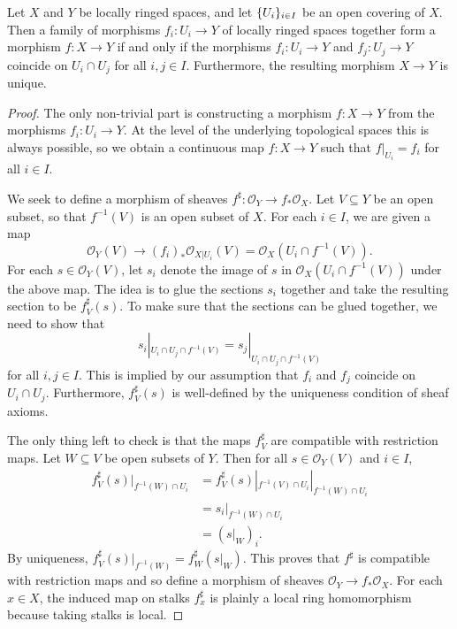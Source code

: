 \documentclass[12pt]{book}
\theoremstyle{definition}
\DeclarePairedDelimiter{\Set}{\lbrace}{\rbrace}
\begin{document}
	\begin{lemma}
		Let $X$ and $Y$ be locally ringed spaces, and let $\Set{U_i}_{i \in I}$ be an open covering of $X$. Then a family of morphisms $f_i \colon U_i \to Y$ of locally ringed spaces together form a morphism $f \colon X \to Y$ if and only if the morphisms $f_i \colon U_i \to Y$ and $f_j \colon U_j \to Y$ coincide on $U_i \cap U_j$ for all $i, j \in I$. Furthermore, the resulting morphism $X \to Y$ is unique.
	\end{lemma}
	\begin{proof}
		The only non-trivial part is constructing a morphism $f \colon X \to Y$ from the morphisms $f_i \colon U_i \to Y$. At the level of the underlying topological spaces this is always possible, so we obtain a continuous map $f\colon X \to Y$ such that $f|_{U_i} = f_i$ for all $i \in I$.
		
		We seek to define a morphism of sheaves $f^\sharp \colon \mathcal{O}_Y \to f_\ast\mathcal{O}_X$. Let $V \subseteq Y$ be an open subset, so that $f^{-1}(V)$ is an open subset of $X$. For each $i \in I$, we are given a map
		\begin{equation*}
			\mathcal{O}_Y(V) \to (f_i)_{\ast}\mathcal{O}_{X|U_i}(V) = \mathcal{O}_{X}(U_i \cap f^{-1}(V)).
		\end{equation*}
		For each $s \in \mathcal{O}_Y(V)$, let $s_i$ denote the image of $s$ in $\mathcal{O}_{X}(U_i \cap f^{-1}(V))$ under the above map. The idea is to glue the sections $s_i$ together and take the resulting section to be $f^\sharp_V(s)$. To make sure that the sections can be glued together, we need to show that
		\begin{equation*}
			s_i|_{U_i \cap U_j \cap f^{-1}(V)} = s_j|_{U_i \cap U_j \cap f^{-1}(V)}
		\end{equation*}
		for all $i, j \in I$. This is implied by our assumption that $f_i$ and $f_j$ coincide on $U_i \cap U_j$. Furthermore, $f^\sharp_V(s)$ is well-defined by the uniqueness condition of sheaf axioms.
		
		The only thing left to check is that the maps $ f^\sharp_V$ are compatible with restriction maps. Let $W \subseteq V$ be open subsets of $Y$. Then for all $s \in \mathcal{O}_Y(V)$ and $i \in I$,
		\begin{align*}
		f_V^\sharp(s)|_{f^{-1}(W) \cap U_i} & = f_V^\sharp(s)|_{f^{-1}(V) \cap U_i}|_{f^{-1}(W) \cap U_i} \\
		& = s_i|_{f^{-1}(W) \cap U_i}\\
		& = (s|_W)_i.
		\end{align*}
		By uniqueness, $f^\sharp_V(s)|_{f^{-1}(W)} = f^\sharp_W(s|_W)$. This proves that $f^\sharp$ is compatible with restriction maps and so define a morphism of sheaves $\mathcal{O}_Y \to f_\ast\mathcal{O}_X$. For each $x \in X$, the induced map on stalks $f^\sharp_x$ is plainly a local ring homomorphism because taking stalks is local.
	\end{proof}	
	
\end{document}
